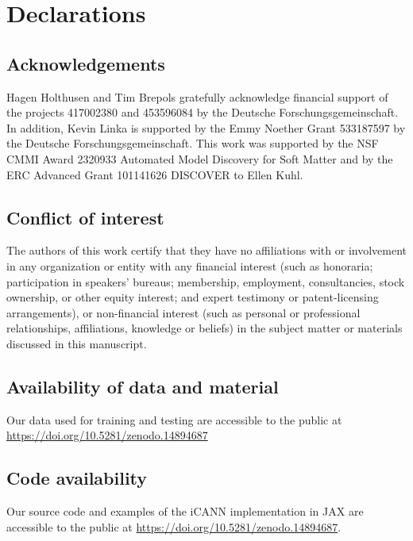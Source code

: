 \section{Declarations}
%
\subsection{Acknowledgements}
%
Hagen Holthusen and Tim Brepols gratefully acknowledge financial support of the projects 417002380 and 453596084 by the Deutsche Forschungsgemeinschaft.
In addition, Kevin Linka is supported by the Emmy Noether Grant 533187597 by the Deutsche Forschungsgemeinschaft.
This work was supported by the NSF CMMI Award 2320933 Automated Model Discovery for Soft Matter and by the ERC Advanced Grant 101141626 DISCOVER to Ellen Kuhl.
%
%
\subsection{Conflict of interest}
%
The authors of this work certify that they have no affiliations with or involvement in any organization or entity with any financial interest (such as honoraria; participation in speakers’ bureaus; membership, employment, consultancies, stock ownership, or other equity interest; and expert testimony or patent-licensing arrangements), or non-financial interest (such as personal or professional relationships, affiliations, knowledge or beliefs) in the subject matter or materials discussed in this manuscript.
%
\subsection{Availability of data and material}
%
Our data used for training and testing are accessible to the public at \url{https://doi.org/10.5281/zenodo.14894687}
%
\subsection{Code availability}
%
Our source code and examples of the iCANN implementation in JAX are accessible to the public at \url{https://doi.org/10.5281/zenodo.14894687}.
%
